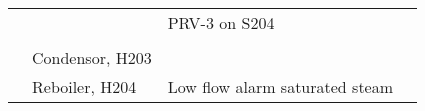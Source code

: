 \begin{table}[h]
\begin{tabularx}{\linewidth}{@{}lp{3cm}XX@{}}
     &                                            & PRV-3 on S204                                                                                                                                                 &                                                                                                                                                                                                                                                         \\ \cmidrule(l){3-4} 
     &                                            &                                                                                                                                                               &                                                                                                                                                                                                                                                         \\ \cmidrule(l){2-4} 
     & \multirow[t]{3}{*}{Condensor, H203}           &                                                                                                                                                               &                                                                                                                                                                                                                                                         \\ \cmidrule(l){3-4} 
     &                                            &                                                                                                                                                               &                                                                                                                                                                                                                                                         \\ \cmidrule(l){3-4} 
     &                                            &                                                                                                                                                               &                                                                                                                                                                                                                                                         \\ \cmidrule(l){2-4} 
     & Reboiler, H204                             & Low flow alarm saturated steam                                                                                                                                &                                                                                                                                                                                                                                                         \\ \bottomrule
\end{tabularx}%
\end{table}
